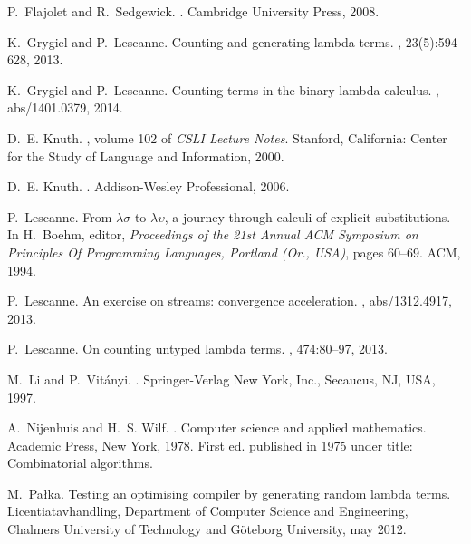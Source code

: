 \documentclass{sig-alternate}
\begin{document}
\begin{thebibliography}{10}
P.~Flajolet and R.~Sedgewick.
.
\newblock Cambridge University Press, 2008.

K.~Grygiel and P.~Lescanne.
\newblock Counting and generating lambda terms.
, 23(5):594--628, 2013.

K.~Grygiel and P.~Lescanne.
\newblock Counting terms in the binary lambda calculus.
, abs/1401.0379, 2014.

D.~E. Knuth.
, volume 102 of {\em
  CSLI Lecture Notes}.
\newblock Stanford, California: Center for the Study of Language and
  Information, 2000.

D.~E. Knuth.
.
\newblock Addison-Wesley Professional, 2006.

P.~Lescanne.
\newblock From $\lambda\sigma$ to $\lambda\upsilon$, a journey through calculi
  of explicit substitutions.
\newblock In H.~Boehm, editor, {\em Proceedings of the 21st Annual {ACM}
  Symposium on {P}rinciples {O}f {P}rogramming {L}anguages, {Portland (Or.,
  USA)}}, pages 60--69. ACM, 1994.

P.~Lescanne.
\newblock An exercise on streams: convergence acceleration.
, abs/1312.4917, 2013.

P.~Lescanne.
\newblock On counting untyped lambda terms.
, 474:80--97, 2013.

M.~Li and P.~Vit\'{a}nyi.
.
\newblock Springer-Verlag New York, Inc., Secaucus, NJ, USA, 1997.

A.~Nijenhuis and H.~S. Wilf.
.
\newblock Computer science and applied mathematics. Academic Press, New York,
  1978.
\newblock First ed. published in 1975 under title: Combinatorial algorithms.

M.~Pa{\l}ka.
\newblock Testing an optimising compiler by generating random lambda terms.
\newblock Licentiatavhandling, Department of Computer Science and Engineering,
  Chalmers University of Technology and G\"oteborg University, may 2012.


\end{thebibliography}
\end{document}
